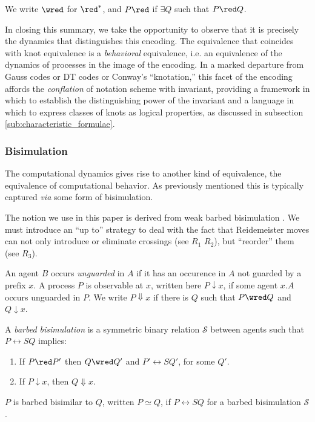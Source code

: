 We write $\wred$ for $\red^*$, and $P\red$ if $\exists Q $ such that $ P \red Q$.

In closing this summary, we take the opportunity to observe that it is
precisely the dynamics that distinguishes this encoding. The
equivalence that coincides with knot equivalence is a \emph{behavioral}
equivalence, i.e. an equivalence of the dynamics of processes in the
image of the encoding. In a marked departure from Gauss codes or
DT codes or Conway's ``knotation,'' this facet of the encoding affords
the \emph{conflation} of notation scheme with invariant, providing a
framework in which to establish the distinguishing power of the
invariant and a language in which to express classes of knots as
logical properties, as discussed in subsection \ref{sub:characteristic_formulae}.

\subsubsection{Bisimulation}

The computational dynamics gives rise to another kind of equivalence,
the equivalence of computational behavior. As previously mentioned
this is typically captured \emph{via} some form of bisimulation.


The notion we use in this paper is derived from weak barbed
bisimulation \cite{milner91polyadicpi}. We must introduce an ``up to''
\cite{DBLP:conf/concur/SangiorgiM92} \cite{DBLP:conf/concur/Pous06}
strategy to deal with the fact that Reidemeister moves can not only
introduce or eliminate crossings (see $R_1$ $R_2$), but ``reorder''
them (see $R_3$).

\begin{definition}
  An agent $B$ occurs \emph{unguarded} in $A$ if it has an occurence
  in $A$ not guarded by a prefix $x$. A process $P$ is observable at
  $x$, written here $P \downarrow x$, if some agent $x.A$ occurs
  unguarded in $P$. We write $P \Downarrow x$ if there is $Q$ such
  that $P \wred Q$ and $Q \downarrow x$.
\end{definition}

\begin{definition}
A \emph{barbed bisimulation} is a symmetric binary relation 
${\mathcal S}$ between agents such that $P\rel{S}Q$ implies:
\begin{enumerate}
\item If $P \red P'$ then $Q \wred Q'$ and $P'\rel{S} Q'$, for some $Q'$.
\item If $P\downarrow x$, then $Q\Downarrow x$.
\end{enumerate}
$P$ is barbed bisimilar to $Q$, written
$P \simeq Q$, if $P \rel{S} Q$ for a barbed bisimulation ${\mathcal S}$.
\end{definition}

